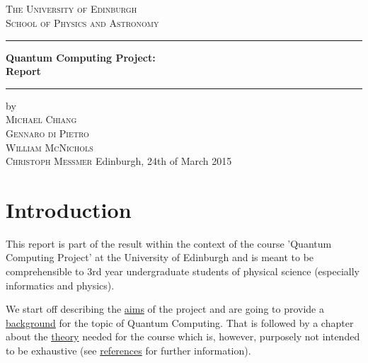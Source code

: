 \documentclass[bibliography=totocnumbered]{article}
\title{
 \titlename\\
  \vspace{2cm}
  \vspace{1cm}
}
\author{\authorname}
\date{}
\theoremstyle{NoticeStyle}
\begin{document}
\newpage
\begin{titlepage}
	\centering
	{\LARGE \textsc{The University of Edinburgh}}\\[5pt]
	{\large \textsc{School of Physics and Astronomy}}\\
	\vspace{80pt}
	
	\rule{\linewidth}{1pt}
	{
	\textbf{\LARGE Quantum Computing Project:\\Report}
	}
	\rule{\linewidth}{1pt}
	
	\vspace{80pt}
	{\large
		
	}
	
	\vspace{200pt}
	{\large
	by\\
	\textsc{Michael Chiang\\
	Gennaro di Pietro\\
	William McNichols\\
	Christoph Meßmer}
	}
	\vfill
	{\large Edinburgh, 24th of March 2015}
\end{titlepage}

\newpage


\tableofcontents
\newpage


%
\section{Introduction}
This report is part of the result within the context of the course 'Quantum Computing Project' at the University of Edinburgh and is meant to be comprehensible to 3rd year undergraduate students of physical science (especially informatics and physics).

We start off describing the \hyperref[sec:Aims]{aims} of the project and are going to provide a \hyperref[sec:Background]{background} for the topic of Quantum Computing. That is followed by a chapter about the \hyperref[sec:Theory]{theory} needed for the course which is, however, purposely not intended to be exhaustive (see \hyperref[sec:References]{references} for further information).
\end{document}
